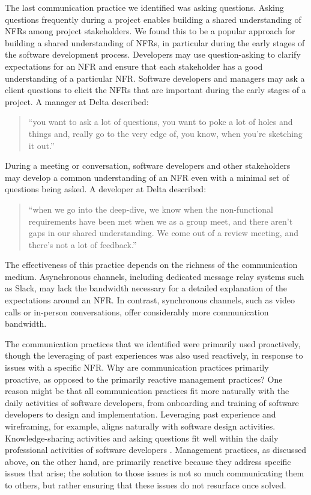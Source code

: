 \documentclass[smallextended]{svjour3}       %
\begin{document}
The last communication practice we identified was asking questions. 
Asking questions frequently during a project enables building a shared understanding of NFRs among project stakeholders. 
We found this to be a popular approach for building a shared understanding of NFRs, in particular during the early stages of the software development process. 
Developers may use question-asking to clarify expectations for an NFR and ensure that each stakeholder has a good understanding of a particular NFR. 
Software developers and managers may ask a client questions to elicit the NFRs that are important during the early stages of a project. A manager at Delta described:
\begin{quote}
    ``you want to ask a lot of questions, you want to poke a lot of holes and things and, really go to the very edge of, you know, when you’re sketching it out.''
\end{quote}
During a meeting or conversation, software developers and other stakeholders may develop a common understanding of an NFR even with a minimal set of questions being asked.
A developer at Delta described:
\begin{quote}
    ``when we go into the deep-dive, we know when the non-functional requirements have been met when we as a group meet, and there aren’t gaps in our shared understanding. We come out of a review meeting, and there’s not a lot of feedback.''
\end{quote}    
%
The effectiveness of this practice 
depends on the richness of the communication medium.
Asynchronous channels, including dedicated message relay systems such as Slack, may lack the bandwidth necessary for a detailed explanation of the expectations around an NFR.  
In contrast, synchronous channels, such as video calls or in-person conversations, offer considerably more communication bandwidth.


The communication practices that we identified were primarily used proactively, though the leveraging of past experiences was also used reactively, in response to issues with a specific NFR. Why are communication practices primarily proactive, as opposed to the primarily reactive management practices? 
One reason might be that all communication practices fit more naturally with the daily activities of software developers, from onboarding and training of software developers to design and implementation. Leveraging past experience and wireframing, for example, aligns naturally with software design activities. Knowledge-sharing activities and asking questions fit well within the daily professional activities of software developers \citep{meyer2019today,kautz2008knowledge}.
Management practices, as discussed above, on the other hand, are primarily reactive because they address specific issues that arise; the solution to those issues is not so much communicating them to others, but rather ensuring that these issues do not resurface once solved.
\end{document}
